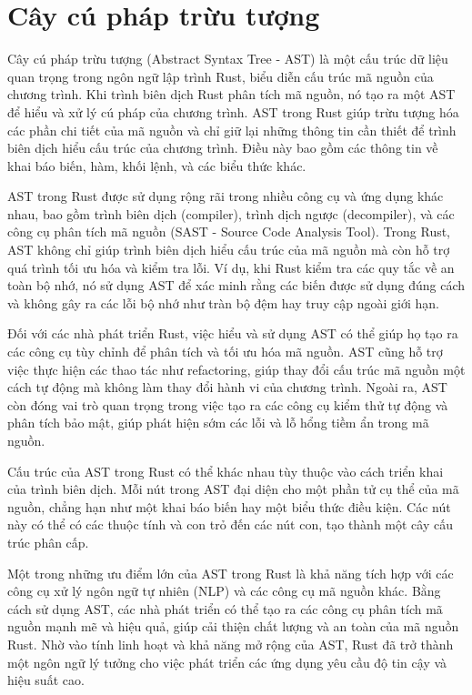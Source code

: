 \section{Cây cú pháp trừu tượng}

Cây cú pháp trừu tượng (Abstract Syntax Tree - AST) là một cấu trúc dữ liệu quan trọng trong ngôn ngữ lập trình Rust, biểu diễn cấu trúc mã nguồn của chương trình. Khi trình biên dịch Rust phân tích mã nguồn, nó tạo ra một AST để hiểu và xử lý cú pháp của chương trình. AST trong Rust giúp trừu tượng hóa các phần chi tiết của mã nguồn và chỉ giữ lại những thông tin cần thiết để trình biên dịch hiểu cấu trúc của chương trình. Điều này bao gồm các thông tin về khai báo biến, hàm, khối lệnh, và các biểu thức khác.

AST trong Rust được sử dụng rộng rãi trong nhiều công cụ và ứng dụng khác nhau, bao gồm trình biên dịch (compiler), trình dịch ngược (decompiler), và các công cụ phân tích mã nguồn (SAST - Source Code Analysis Tool). Trong Rust, AST không chỉ giúp trình biên dịch hiểu cấu trúc của mã nguồn mà còn hỗ trợ quá trình tối ưu hóa và kiểm tra lỗi. Ví dụ, khi Rust kiểm tra các quy tắc về an toàn bộ nhớ, nó sử dụng AST để xác minh rằng các biến được sử dụng đúng cách và không gây ra các lỗi bộ nhớ như tràn bộ đệm hay truy cập ngoài giới hạn.

Đối với các nhà phát triển Rust, việc hiểu và sử dụng AST có thể giúp họ tạo ra các công cụ tùy chỉnh để phân tích và tối ưu hóa mã nguồn. AST cũng hỗ trợ việc thực hiện các thao tác như refactoring, giúp thay đổi cấu trúc mã nguồn một cách tự động mà không làm thay đổi hành vi của chương trình. Ngoài ra, AST còn đóng vai trò quan trọng trong việc tạo ra các công cụ kiểm thử tự động và phân tích bảo mật, giúp phát hiện sớm các lỗi và lỗ hổng tiềm ẩn trong mã nguồn.

Cấu trúc của AST trong Rust có thể khác nhau tùy thuộc vào cách triển khai của trình biên dịch. Mỗi nút trong AST đại diện cho một phần tử cụ thể của mã nguồn, chẳng hạn như một khai báo biến hay một biểu thức điều kiện. Các nút này có thể có các thuộc tính và con trỏ đến các nút con, tạo thành một cây cấu trúc phân cấp.

Một trong những ưu điểm lớn của AST trong Rust là khả năng tích hợp với các công cụ xử lý ngôn ngữ tự nhiên (NLP) và các công cụ mã nguồn khác. Bằng cách sử  dụng AST, các nhà phát triển có thể tạo ra các công cụ phân tích mã nguồn mạnh mẽ và hiệu quả, giúp cải thiện chất lượng và an toàn của mã nguồn Rust. Nhờ vào tính linh hoạt và khả năng mở rộng của AST, Rust đã trở thành một ngôn ngữ lý tưởng cho việc phát triển các ứng dụng yêu cầu độ tin cậy và hiệu suất cao.

